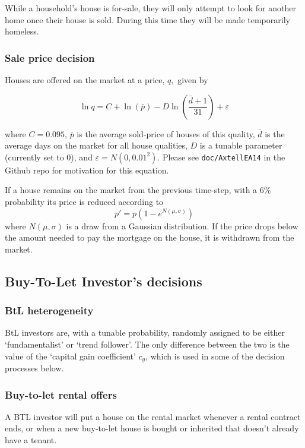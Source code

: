 \documentclass{report}
\begin{document}
While a household's house is for-sale, they will only attempt to look for another home once their house is sold. During this time they will be made temporarily homeless.

\subsubsection{Sale price decision}
\label{saleprice}
Houses are offered on the market at a price, $q,$ given by

\begin{equation}
\ln q=C+\ln (\bar{p})-D\ln \left( \frac{\bar{d}+1}{31}\right) +\varepsilon
\label{salepriceeq}
\end{equation}

where $C=0.095$, $\bar{p}$ is the average sold-price of houses of this quality, $\bar{d}$ is the average days on the market for all house qualities, $D$ is a tunable parameter (currently set to 0), and $\varepsilon=N(0,0.01^{2})$. Please see \texttt{doc/AxtellEA14} in the Github repo for motivation for this equation.

If a house remains on the market from the previous time-step, with a 6\%
probability its price is reduced according to
\begin{equation}
p' = p\left(1-e^{N(\mu,\sigma)}\right)
\label{reprice}
\end{equation}
where $N(\mu,\sigma)$ is a draw from a Gaussian distribution.
 If the price drops below the amount needed to pay the mortgage on the house, it is withdrawn from the market.

\subsection{Buy-To-Let Investor's decisions}
\subsubsection{BtL heterogeneity}
BtL investors are, with a tunable probability, randomly assigned to be either `fundamentalist' or `trend follower'. The only difference between the two is the value of the `capital gain coefficient' $c_{g}$, which is used in some of the decision processes below.

\subsubsection{Buy-to-let rental offers}
A BTL investor will put a house on the rental market whenever a rental contract ends, or when a new buy-to-let house is bought or inherited that doesn't already have a tenant.
\end{document}
